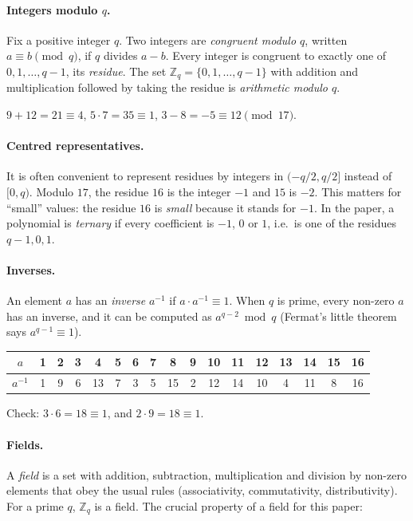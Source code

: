 \documentclass[11pt,a4paper]{article}
\newcommand{\Zq}{\mathbb{Z}_q}
\theoremstyle{definition}
\theoremstyle{plain}
\begin{document}
\paragraph{Integers modulo $q$.}
Fix a positive integer $q$. Two integers are \emph{congruent modulo $q$}, written $a\equiv b
\pmod q$, if $q$ divides $a-b$. Every integer is congruent to exactly one of $0,1,\dots,q-1$, its
\emph{residue}. The set $\Zq=\{0,1,\dots,q-1\}$ with addition and multiplication followed by
taking the residue is \emph{arithmetic modulo $q$}.

\begin{example}[$q=17$]
$9+12=21\equiv 4$, \quad $5\cdot 7=35\equiv 1$, \quad $3-8=-5\equiv 12 \pmod{17}$.
\end{example}

\paragraph{Centred representatives.} It is often convenient to represent residues by integers in
$(-q/2,q/2]$ instead of $[0,q)$. Modulo $17$, the residue $16$ is the integer $-1$ and $15$ is
$-2$. This matters for ``small'' values: the residue $16$ is \emph{small} because it stands for $-1$.
In the paper, a polynomial is \emph{ternary} if every coefficient is $-1$, $0$ or $1$, i.e.\ is one
of the residues $q-1,0,1$.

\paragraph{Inverses.} An element $a$ has an \emph{inverse} $a^{-1}$ if $a\cdot a^{-1}\equiv 1$.
When $q$ is prime, every non-zero $a$ has an inverse, and it can be computed as $a^{q-2}\bmod q$
(Fermat's little theorem says $a^{q-1}\equiv 1$).

\begin{example}
\begin{center}\small
\begin{tabular}{c|cccccccccccccccc}
$a$      & 1 & 2 & 3 & 4 & 5 & 6 & 7 & 8 & 9 & 10 & 11 & 12 & 13 & 14 & 15 & 16\\\hline
$a^{-1}$ & 1 & 9 & 6 & 13 & 7 & 3 & 5 & 15 & 2 & 12 & 14 & 10 & 4 & 11 & 8 & 16
\end{tabular}
\end{center}
Check: $3\cdot 6=18\equiv 1$, and $2\cdot 9=18\equiv 1$.
\end{example}

\paragraph{Fields.} A \emph{field} is a set with addition, subtraction, multiplication and division
by non-zero elements that obey the usual rules (associativity, commutativity, distributivity). For a
prime $q$, $\Zq$ is a field. The crucial property of a field for this paper:
\end{document}
